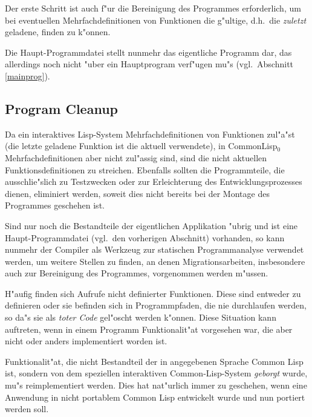 Der erste Schritt ist auch f"ur die Bereinigung des Programmes
erforderlich, um bei eventuellen Mehrfachdefinitionen von Funktionen
die g"ultige, d.h.\ die {\em zuletzt} geladene, finden zu k"onnen.

Die Haupt-Programmdatei stellt nunmehr das eigentliche Programm dar,
das allerdings noch nicht "uber ein Hauptprogram verf"ugen mu"s
(vgl.\ Abschnitt \ref{mainprog}). 

\subsection{Program Cleanup}

Da ein interaktives Lisp-System Mehrfachdefinitionen von Funktionen
zul"a"st (die letzte geladene Funktion ist die aktuell verwendete), in
CommonLisp$_0$ Mehrfachdefinitionen aber nicht zul"assig sind, sind die
nicht aktuellen Funktionsdefinitionen zu streichen. Ebenfalls
sollten die Programmteile, die ausschlie"slich zu Testzwecken oder zur
Erleichterung des Entwicklungsprozesses dienen, eliminiert werden,
soweit dies nicht bereits bei der Montage des Programmes geschehen
ist. 

Sind nur noch die Bestandteile der eigentlichen Applikation "ubrig und
ist eine Haupt-Programmdatei (vgl.\ den vorherigen Abschnitt)
vorhanden, so kann nunmehr der Compiler als Werkzeug zur statischen
Programmanalyse verwendet werden, um weitere Stellen zu finden,
an denen Migrationsarbeiten, insbesondere auch zur Bereinigung des
Programmes, vorgenommen werden m"ussen. 

H"aufig finden sich Aufrufe nicht definierter Funktionen. Diese sind
entweder zu definieren oder sie befinden sich in Programmpfaden, die
nie durchlaufen werden, so da"s sie als {\em toter Code} gel"oscht werden
k"onnen. Diese Situation kann auftreten, wenn in einem Programm
Funktionalit"at vorgesehen war, die aber nicht oder anders
implementiert worden ist. 

Funktionalit"at, die nicht Bestandteil der in \cite{steele90}
angegebenen Sprache Common Lisp ist,
sondern von dem speziellen interaktiven Common-Lisp-System {\em
geborgt} wurde, mu"s reimplementiert werden. Dies hat nat"urlich immer
zu geschehen, wenn eine Anwendung in nicht portablem Common Lisp
entwickelt wurde und nun portiert werden soll.


